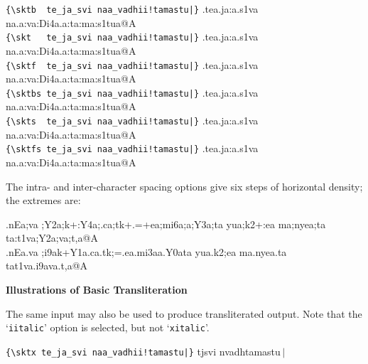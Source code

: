 \documentclass[12pt]{article}
\begin{document}
\verb+{\+\verb+sktb  te_ja_svi naa_vadhii!tamastu|}+\hspace{2mm}
             {\sktb  .tea.ja:a.s1va na.a:va:Di4a.a:ta:ma:s1tua@A}\\[1mm]
\verb+{\+\verb+skt   te_ja_svi naa_vadhii!tamastu|}+\hspace{2mm}
             {\skt  .tea.ja:a.s1va na.a:va:Di4a.a:ta:ma:s1tua@A}\\[1mm]
\verb+{\+\verb+sktf  te_ja_svi naa_vadhii!tamastu|}+\hspace{2mm}
             {\sktf  .tea.ja:a.s1va na.a:va:Di4a.a:ta:ma:s1tua@A}\\[1mm]
\verb+{\+\verb+sktbs te_ja_svi naa_vadhii!tamastu|}+\hspace{2mm}
             {\sktbs .tea.ja:a.s1va na.a:va:Di4a.a:ta:ma:s1tua@A}\\[1mm]
\verb+{\+\verb+skts  te_ja_svi naa_vadhii!tamastu|}+\hspace{2mm}
             {\skts  .tea.ja:a.s1va na.a:va:Di4a.a:ta:ma:s1tua@A}\\[1mm]
\verb+{\+\verb+sktfs te_ja_svi naa_vadhii!tamastu|}+\hspace{2mm}
             {\sktfs .tea.ja:a.s1va na.a:va:Di4a.a:ta:ma:s1tua@A}


The intra- and inter-character spacing options give six steps of horizontal
density; the extremes are:
\vspace{-1mm}
\begin{center}
{\skt  .nEa;va ;Y2a;k+:Y4a;.ca;tk+.=+ea;mi6a;a;Y3a;ta yua;k2+:ea ma;nyea;ta ta:t1va;Y2a;va;t,a@A}\\[2mm]
{\skt  .nEa.va ;i9ak+Y1a.ca.tk;=.ea.mi3aa.Y0ata yua.k2;ea ma.nyea.ta tat1va.i9ava.t,a@A}
\end{center}
\vspace{-1mm}

{\large\bf Illustrations of Basic Transliteration\par}

The same input may also be used to produce transliterated output.
Note that the `\verb+iitalic+' option is selected, but not `\verb+xitalic+'.

{\skt }
\verb+{\+\verb+sktx te_ja_svi naa_vadhii!tamastu|}+\hspace{.8mm}
             {\sktx tjsvi nvadhtamastu{\upshape\,$\mid$}}
\end{document}
